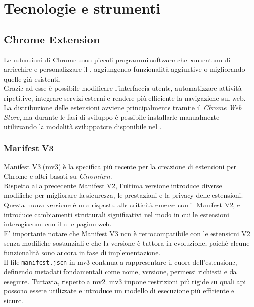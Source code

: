 \section{Tecnologie e strumenti}
\subsection{Chrome Extension}
\noindent Le estensioni di Chrome sono piccoli programmi software che consentono di arricchire e personalizzare il , aggiungendo funzionalità aggiuntive o migliorando quelle già esistenti.\\
Grazie ad esse è possibile modificare l’interfaccia utente, automatizzare attività ripetitive, integrare servizi esterni e rendere più efficiente la navigazione sul web.\\ 
La distribuzione delle estensioni avviene principalmente tramite il \textit{Chrome Web Store}, ma durante le fasi di sviluppo è possibile installarle manualmente utilizzando la modalità sviluppatore disponibile nel .

\subsubsection{Manifest V3}
\noindent Manifest V3 (\acrshort{mv3}) è la specifica più recente per la creazione di estensioni per Chrome e altri  basati su \textit{Chromium}. \\Rispetto alla precedente Manifest V2, l'ultima versione introduce diverse modifiche per migliorare la sicurezza, le prestazioni e la privacy delle estensioni.  \\
Questa nuova versione è una risposta alle criticità emerse con il Manifest V2, e introduce cambiamenti strutturali significativi nel modo in cui le estensioni interagiscono con il  e le pagine web.\\
E' importante notare che Manifest V3 non è retrocompatibile con le estensioni V2 senza modifiche sostanziali e che la versione è tuttora in evoluzione, poiché alcune funzionalità sono ancora in fase di implementazione.\\
Il file \texttt{manifest.json} in \acrshort{mv3} continua a rappresentare il cuore dell’estensione, definendo metadati fondamentali come nome, versione, permessi richiesti e  da eseguire. Tuttavia, rispetto a \acrshort{mv2}, \acrshort{mv3} impone restrizioni più rigide su quali \acrshort{api} possono essere utilizzate e introduce un modello di esecuzione più efficiente e sicuro.\\

